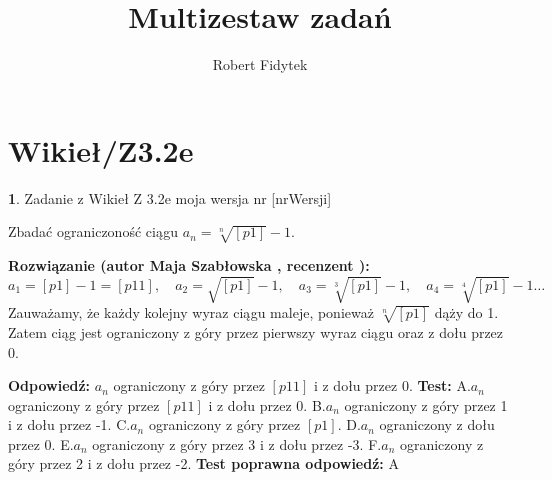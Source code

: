 \documentclass[12pt, a4paper]{article}
\title{Multizestaw zadań}
\author{Robert Fidytek}
\date{}
\theoremstyle{definition} %
\newtheorem{zad}{}
\newcommand{\kategoria}[1]{\section{#1}} %
\newcommand{\zadStart}[1]{\begin{zad}#1\newline} %
\newcommand{\zadStop}{\end{zad}}   %
\newcommand{\rozwStart}[2]{\noindent \textbf{Rozwiązanie (autor #1 , recenzent #2): }\newline} %
\newcommand{\rozwStop}{\newline}                                            %
\newcommand{\odpStart}{\noindent \textbf{Odpowiedź:}\newline}    %
\newcommand{\odpStop}{\newline}                                             %
\newcommand{\testStart}{\noindent \textbf{Test:}\newline} %
\newcommand{\testStop}{\newline} %
\newcommand{\kluczStart}{\noindent \textbf{Test poprawna odpowiedź:}\newline} %
\newcommand{\kluczStop}{\newline} %
\begin{document}
\maketitle


\kategoria{Wikieł/Z3.2e}
\zadStart{Zadanie z Wikieł Z 3.2e moja wersja nr [nrWersji]}

Zbadać ograniczoność ciągu $a_{n}=\sqrt[n]{[p1]}-1.$
\zadStop

\rozwStart{Maja Szabłowska}{}
$$a_{1}=[p1]-1=[p11], \quad a_{2}=\sqrt{[p1]}-1, \quad a_{3}=\sqrt[3]{[p1]}-1, \quad a_{4}=\sqrt[4]{[p1]}-1 \ldots$$
Zauważamy, że każdy kolejny wyraz ciągu maleje, ponieważ $\sqrt[n]{[p1]}$ dąży do 1. Zatem ciąg jest ograniczony z góry przez pierwszy wyraz ciągu oraz z dołu przez 0.
\rozwStop


\odpStart
$a_{n}$ ograniczony z góry przez $[p11]$ i z dołu przez 0.
\odpStop
\testStart
A.$a_{n}$ ograniczony z góry przez $[p11]$ i z dołu przez 0.
B.$a_{n}$ ograniczony z góry przez 1 i z dołu przez -1.
C.$a_{n}$ ograniczony z góry przez $[p1]$.
D.$a_{n}$ ograniczony z dołu przez 0.
E.$a_{n}$ ograniczony z góry przez 3 i z dołu przez -3.
F.$a_{n}$ ograniczony z góry przez 2 i z dołu przez -2.
\testStop
\kluczStart
A
\kluczStop
\end{document}
